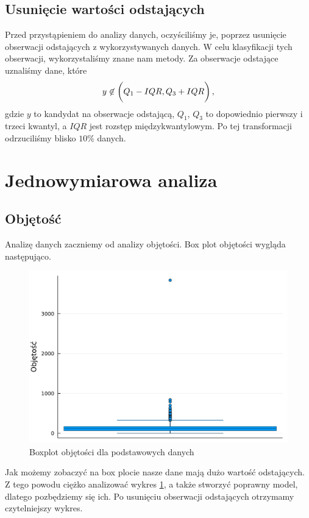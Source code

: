 \documentclass[12pt]{article}
\theoremstyle{exer}
\begin{document}
	\subsection{Usunięcie wartości odstających}
	Przed przystąpieniem do analizy danych, oczyściliśmy je, poprzez usunięcie obserwacji odstających z wykorzystywanych danych. W celu klasyfikacji tych obserwacji, wykorzystaliśmy znane nam metody. Za obserwacje odstające uznaliśmy dane, które
	\begin{equation}
		y\not\in\left(\vphantom{\frac{1}{1}}Q_1-IQR,Q_3+IQR\right),
	\end{equation}
	gdzie $y$ to kandydat na obserwacje odstającą, $Q_1$, $Q_3$ to dopowiednio pierwszy i trzeci kwantyl, a $IQR$ jest rozstęp międzykwantylowym. Po tej transformacji odrzuciliśmy blisko $10\%$ danych.
	\section{Jednowymiarowa analiza}
	\subsection{Objętość}
	Analizę danych zaczniemy od analizy objętości. Box plot objętości wygląda następująco.
	
	\begin{figure}[H]
		\centering
		\includegraphics[width=3\columnwidth/4]{images/boxplot_V_danych.pdf}
		\caption{Boxplot objętości dla podstawowych danych}
		\label{fig:box_V_orginal}
	\end{figure}
	
	Jak możemy zobaczyć na box plocie nasze dane mają dużo wartość odstających. Z tego powodu ciężko analizować wykres \ref{fig:box_V_orginal}, a także stworzyć poprawny model, dlatego pozbędziemy się ich. Po usunięciu obserwacji odstających otrzymamy czytelniejszy wykres.
	
\end{document}
